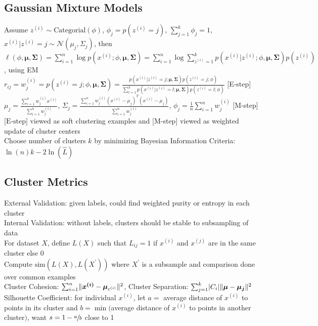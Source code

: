\documentclass{article}
\DeclarePairedDelimiter\abs{\lvert}{\rvert}
\DeclarePairedDelimiter\norm{\lVert}{\rVert}
\begin{document}
\subsection{Gaussian Mixture Models}
Assume $z^{(i)} \sim \mbox{Categorial}(\phi)$, $\phi_j = p(z^{(i)} = j)$, $\sum_{j=1}^k \phi_j = 1$, $x^{(i)} | z^{(i)} = j \sim \mathcal{N}(\mu_j, \Sigma_j)$, then \\
$\ell(\phi, \boldsymbol \mu, \boldsymbol \Sigma) = \sum\limits_{i=1}^n \log p(x^{(i)}; \phi, \boldsymbol \mu, \boldsymbol \Sigma) = \sum\limits_{i=1}^n \log \sum\limits_{z^{(i)}=1}^k p(x^{(i)}| z^{(i)}; \phi, \boldsymbol \mu, \boldsymbol \Sigma)p(z^{(i)})$, using EM \\
$r_{ij} = w^{(i)}_j = p(z^{(i)}=j; \phi, \boldsymbol \mu, \boldsymbol \Sigma) = \frac{p(x^{(i)}|z^{(i)}=j; \boldsymbol \mu, \boldsymbol \Sigma)p(z^{(i)}=j ; \phi)}{\sum_{l=1}^k p(x^{(i)}|z^{(i)}=l; \boldsymbol \mu, \boldsymbol \Sigma)p(z^{(i)}=l ; \phi)}$ [E-step] \\
${\mu_j} = \frac{\sum_{i=1}^n w^{(i)}_jx^{(i)}}{\sum_{i=1}^n w^{(i)}_j}$, ${\Sigma_{j}} = \frac{\sum_{i=1}^nw^{(i)}_j (x^{(i)} - {\mu_j})^T(x^{(i)} - {\mu_j})}{\sum_{i=1}^nw^{(i)}_j}$, $\phi_j = \frac{1}{n}\sum\limits_{i=1}^n w^{(i)}_j$ [M-step] \\
$\mbox{[E-step]}$ viewed as soft clustering examples and [M-step] viewed as weighted update of cluster centers \\
Choose number of clusters $k$ by minimizing Bayesian Information Criteria: $\ln(n)k - 2\ln(\hat L)$ 

\subsection{Cluster Metrics}
External Validation: given labels, could find weighted purity or entropy in each cluster \\
Internal Validation: without labels, clusters should be stable to subsampling of data \\
For dataset $X$, define $L(X)$ such that $L_{ij} = 1$ if $x^{(i)}$ and $x^{(j)}$ are in the same cluster else $0$ \\
Compute $\mbox{sim}(L(X), L(X^\prime))$ where $X^\prime$ is a subsample and comparison done over common examples \\
Cluster Cohesion: $\sum_{i=1}^n \norm{\boldsymbol{x^{(i)}} - \boldsymbol \mu_{c^{(i)}}}^2$, Cluster Separation: $\sum_{j=1}^k \abs{C_i} \norm{\boldsymbol \mu - \boldsymbol{\mu_j}}^2$\\
Silhouette Coefficient: for individual $x^{(i)}$, let $a = $ average distance of $x^{(i)}$ to points in its cluster and $b = \min($average distance of $x^{(i)}$ to points in another cluster$)$, want $s = 1- \sfrac{a}{b}$ close to 1 
\end{document}
